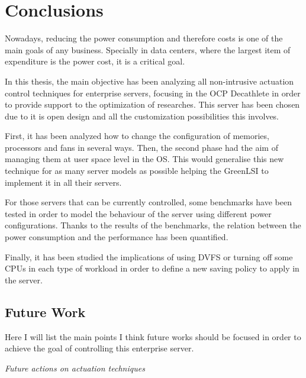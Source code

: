 \chapter{Conclusions}

Nowadays, reducing the power consumption and therefore costs is one of the main goals of any business. Specially in data centers, where the largest item of expenditure is the power cost, it is a critical goal.

In this thesis, the main objective has been analyzing all non-intrusive actuation control techniques for enterprise servers, focusing in the OCP Decathlete in order to provide support to the optimization of researches. This server has been chosen due to it is open design and all the customization possibilities this involves.

First, it has been analyzed how to change the configuration of memories, processors and fans in several ways. Then, the second phase had the aim of managing them at user space level in the OS. This would generalise this new technique for as many server models as possible helping the GreenLSI to implement it in all their servers.

For those servers that can be currently controlled, some benchmarks have been tested in order to model the behaviour of the server using different power configurations. Thanks to the results of the benchmarks, the relation between the power consumption and the performance has been quantified.

Finally, it has been studied the implications of using DVFS or turning off some CPUs in each type of workload in order to define a new saving policy to apply in the server.

\newpage
\section{Future Work}

Here I will list the main points I think future works should be focused in order to achieve the goal of controlling this enterprise server.

\emph{Future actions on actuation techniques}

